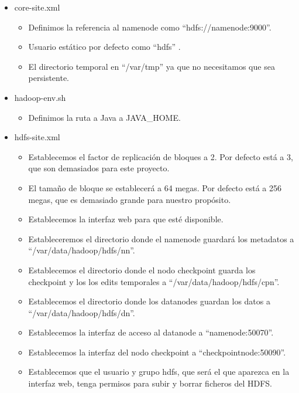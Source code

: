 \begin{itemize}
        \item core-site.xml
        \begin{itemize}
                \item Definimos la referencia al namenode como “hdfs://namenode:9000”.
                \item Usuario estático por defecto como “hdfs” .
                \item El directorio temporal en “/var/tmp” ya que no necesitamos que sea persistente.
        \end{itemize}

        \item hadoop-env.sh
        \begin{itemize}
                \item Definimos la ruta a Java a JAVA\_HOME.
        \end{itemize}

        \item hdfs-site.xml
        \begin{itemize}
                \item Establecemos el factor de replicación de bloques a 2. Por defecto está a 3, que son demasiados para este proyecto.
                \item El tamaño de bloque se establecerá a 64 megas. Por defecto está a 256 megas, que es demasiado grande para nuestro propósito.
                \item Establecemos la interfaz web para que esté disponible.
                \item Estableceremos el directorio donde el namenode guardará los metadatos a “/var/data/hadoop/hdfs/nn”.
                \item Establecemos el directorio donde el nodo checkpoint guarda los checkpoint y los los edits temporales a “/var/data/hadoop/hdfs/cpn”.
                \item Establecemos el directorio donde los datanodes guardan los datos a “/var/data/hadoop/hdfs/dn”.
                \item Establecemos la interfaz de acceso al datanode a “namenode:50070”.
                \item Establecemos la interfaz del nodo checkpoint a “checkpointnode:50090”.
                \item Establecemos que el usuario y grupo hdfs, que será el que aparezca en la interfaz web, tenga permisos para subir y borrar ficheros del HDFS.
        \end{itemize}


\end{itemize}
